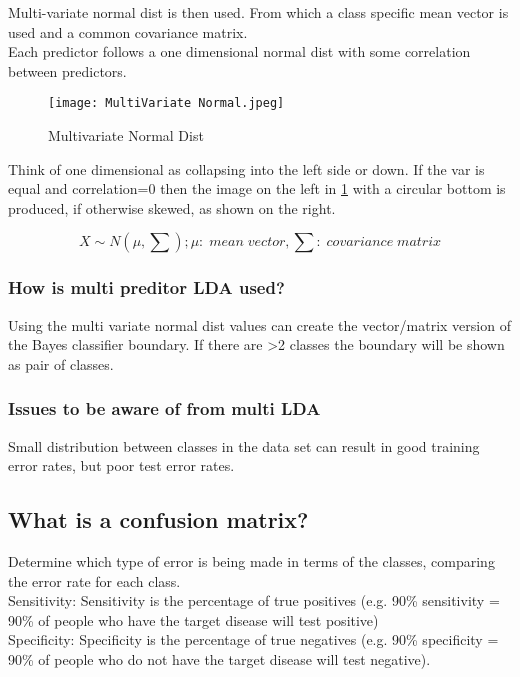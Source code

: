 \documentclass[11pt]{scrartcl} %
\begin{document}
Multi-variate normal dist is then used. From which a class specific mean vector is used and a common covariance matrix.\\

Each predictor follows a one dimensional normal dist with some correlation between predictors.

\begin{figure}[h] %
	\centering
	\texttt{[image: MultiVariate Normal.jpeg]} %
	\caption{Multivariate Normal Dist}
	\label{multi-normal}
\end{figure}

Think of one dimensional as collapsing into the left side or down. If the var is equal and correlation=0
then the image on the left in \ref{multi-normal} with a circular bottom is produced, if otherwise skewed,
as shown on the right.

\begin{equation}
	X \sim N(\mu,\sum); \mu:\; mean\; vector, \sum:\; covariance\; matrix
\end{equation}

\subsubsection{How is multi preditor LDA used?}

Using the multi variate normal dist values can create the vector/matrix version of the Bayes 
classifier boundary. If there are >2 classes the boundary will be shown as pair of classes.

\subsubsection{Issues to be aware of from multi LDA}

Small distribution between classes in the data set can result in good training error rates, but 
poor test error rates.

\subsection{What is a confusion matrix?}

Determine which type of error is being made in terms of the classes, comparing the error rate for
each class.\\

Sensitivity: Sensitivity is the percentage of true positives (e.g. 90\% sensitivity = 90\% of people who have the target disease will test positive)\\
Specificity: Specificity is the percentage of true negatives (e.g. 90\% specificity = 90\% of people who do not have the target disease will test negative).
\end{document}
